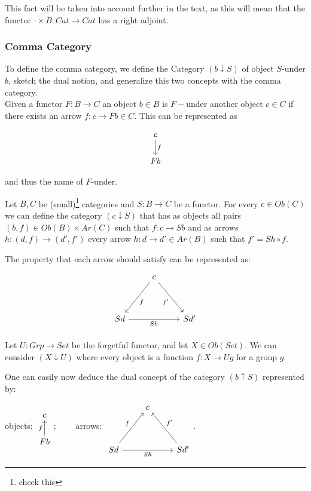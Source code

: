 This fact will be taken into account further in the text, as this will mean that the functor $\cdot \times B: Cat \to Cat$ has a right adjoint.
\subsubsection{Comma Category}

To define the comma category, we define the Category $(b \downarrow S)$ of object $S$-under $b$, sketch the dual notion, and generalize this two concepts with the comma category.\\

Given a functor $F:B\to C$ an object $b\in B$ is $F-$under another object $c\in C$ if there exists an arrow $f:c\to Fb \in C$. This can be represented as

$$
\begin{tikzcd}
      c
      \ar[d,"f"]\\
      Fb
    \end{tikzcd}
$$

and thus the name of $F$-under.

\begin{definition}
  Let $B,C$ be (small)\footnote{check this} categories and $S:B\to C$ be a functor. For every $c\in Ob(C)$ we can define the category $(c \downarrow S)$ that has as objects all pairs $(b,f) \in Ob(B)\times Ar(C)$ such that $f:c\to Sb$ and as arrows $h:(d,f) \to (d',f')$ every arrow $h:d\to d'\in Ar(B)$ such that $f' = Sh\circ f$.
\end{definition}

The property that each arrow should satisfy can be represented as:
\[
  \begin{tikzpicture}
  \node {\begin{tikzcd}
      & c\ar[ddl, "f"]\ar[ddr,"f'",swap] & \\
      &&\\
      Sd\ar[rr, "Sh", swap] & & Sd'
  \end{tikzcd}};
\end{tikzpicture}
\]

\begin{example} Let $U:Grp \to Set$ be the forgetful functor, and let $X\in Ob(Set)$. We can consider $(X\downarrow U)$ where every object is a function $f: X\to Ug$ for a group $g$.  
\end{example}

One can easily now deduce the dual concept of the category $(b\uparrow S)$ represented by: \\
\begin{center}
objects: $
\begin{tikzcd}
      c
      \\
      Fb\ar[u,"f"]
    \end{tikzcd}
$;$\qquad$ arrows: $\begin{tikzcd}
      & c & \\
      &&\\
      Sd\ar[rr, "Sh", swap]\ar[uur, "f"] & & Sd'\ar[uul,"f'",swap]
  \end{tikzcd}$.
\end{center}

